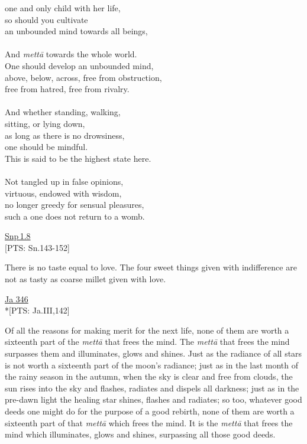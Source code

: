\documentclass[10pt, openright]{book}
\begin{document}
\begin{itemize}
one and only child with her life, \\ 
so should you cultivate \\ 
an unbounded mind towards all beings, \\ 
 \\ 
And \textit{mettā} towards the whole world. \\ 
One should develop an unbounded mind, \\ 
above, below, across, free from obstruction, \\ 
free from hatred, free from rivalry. \\ 
 \\ 
And whether standing, walking, \\ 
sitting, or lying down, \\ 
as long as there is no drowsiness, \\ 
one should be mindful. \\ 
This is said to be the highest state here. \\ 
 \\ 
Not tangled up in false opinions, \\ 
virtuous, endowed with wisdom, \\ 
no longer greedy for sensual pleasures, \\ 
such a one does not return to a womb.


\end{itemize}
\begin{flushright}
\href{https://suttacentral.net/snp1.8/en/sujato}{Snp 1.8}\\

[PTS: Sn.143-152]


\end{flushright}
There is no taste equal to love. The four sweet things given with indifference are not as tasty as coarse millet given with love.


\begin{flushright}
\href{https://suttacentral.net/ja346/en/francis-neil}{Ja 346}\\

*[PTS: Ja.III,142]


\end{flushright}
Of all the reasons for making merit for the next life, none of them are worth a sixteenth part of the \textit{mettā} that frees the mind. The \textit{mettā} that frees the mind surpasses them and illuminates, glows and shines. Just as the radiance of all stars is not worth a sixteenth part of the moon’s radiance; just as in the last month of the rainy season in the autumn, when the sky is clear and free from clouds, the sun rises into the sky and flashes, radiates and dispels all darkness; just as in the pre-dawn light the healing star shines, flashes and radiates; so too, whatever good deeds one might do for the purpose of a good rebirth, none of them are worth a sixteenth part of that \textit{mettā} which frees the mind. It is the \textit{mettā} that frees the mind which illuminates, glows and shines, surpassing all those good deeds.
\end{document}
